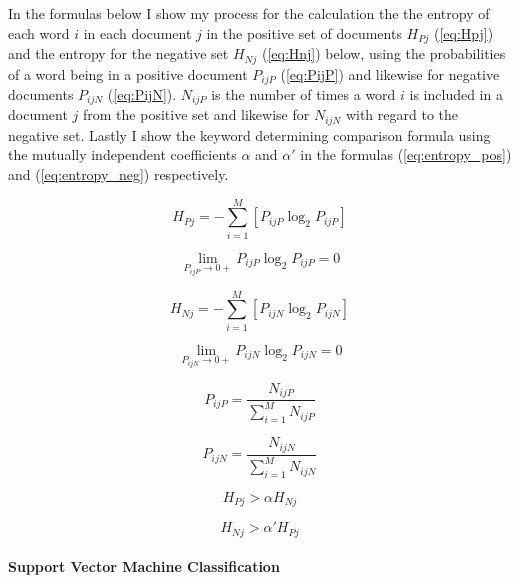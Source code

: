 \documentclass[review]{elsarticle}
\newcommand{\myparagraph}[1]{\paragraph{#1}\mbox{}\smallskip}
\begin{document}
In the formulas below I show my process for the calculation the the entropy of each word \(i\) in each document \(j\) in the positive set of documents \(H_{Pj}\) (\ref{eq:Hpj}) and the entropy for the negative set \(H_{Nj}\) (\ref{eq:Hnj}) below, using the probabilities of a word being in a positive document \(P_{ijP}\) (\ref{eq:PijP}) and likewise for negative documents \(P_{ijN}\) (\ref{eq:PijN}). \(N_{ijP}\) is the number of times a word \(i\) is included in a document \(j\) from the positive set and likewise for \(N_{ijN}\) with regard to the negative set. Lastly I show the keyword determining comparison formula using the mutually independent coefficients \(\alpha\) and \(\alpha'\) in the formulas (\ref{eq:entropy_pos}) and (\ref{eq:entropy_neg}) respectively.

\begin{equation}\label{eq:Hpj}
H_{Pj} = - \sum_{i=1}^M [P_{ijP}\log_2 P_{ijP}]
\end{equation}

\begin{equation}\label{eq:lim_Hpj}
\lim_{P_{ijP}\to0+} P_{ijP}\log_2 P_{ijP} = 0
\end{equation}

\begin{equation}\label{eq:Hnj}
H_{Nj} = - \sum_{i=1}^M [P_{ijN}\log_2 P_{ijN}]
\end{equation}

\begin{equation}\label{eq:lim_Hnj}
\lim_{P_{ijN}\to0+} P_{ijN}\log_2 P_{ijN} = 0
\end{equation}

\begin{equation}\label{eq:PijP}
P_{ijP} = \frac{N_{ijP}}{\sum_{i=1}^M N_{ijP}}
\end{equation}

\begin{equation}\label{eq:PijN}
P_{ijN} = \frac{N_{ijN}}{\sum_{i=1}^M N_{ijN}}
\end{equation}

\begin{equation}\label{eq:entropy_pos}
H_{Pj} > \alpha H_{Nj}
\end{equation}

\begin{equation}\label{eq:entropy_neg}
H_{Nj} > \alpha' H_{Pj}
\end{equation}

\myparagraph{Support Vector Machine Classification}\label{svm}
\end{document}
